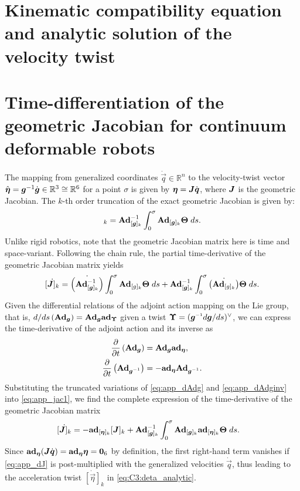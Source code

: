 \section{Kinematic compatibility equation and analytic solution of the velocity twist}

\section{Time-differentiation of the geometric Jacobian for continuum deformable robots} 
\label{app:C3:jacobian}
The mapping from generalized coordinates $\dot{\vec{q}} \in \mathbb{R}^n$ to the velocity-twist vector $\hat{\boldsymbol{\eta}} = \boldsymbol{g}^{-1} \dot{\boldsymbol{g}} \in \mathbb{R}^3 \cong \mathbb{R}^6$ for a point $\sigma$ is given by $\boldsymbol{\eta} = \boldsymbol{J}\dot{\boldsymbol{q}}$, where $\boldsymbol{J}$ is the geometric Jacobian. The $k$-th order truncation of the exact geometric Jacobian is given by:
%
\begin{equation}
[\mat{J}]_k = \Ad_{{[\mat{g}]_k}}^{-1} \int_0^\sigma \Ad_{[\mat{g}]_k} \mat{\Theta} \; ds. \label{eq:app_jac0}
\end{equation}
Unlike rigid robotics, note that the geometric Jacobian matrix here is time and space-variant. Following the chain rule, the partial time-derivative of the geometric Jacobian matrix yields
%
\begin{equation}
\dot{[\boldsymbol{J}]_k} = \dot{\left(\textbf{Ad}_{{[\boldsymbol{g}]_k}}^{-1}\right)} \int_0^\sigma \textbf{Ad}_{[g]_k} \boldsymbol{\Theta} \; ds + \textbf{Ad}_{{[\boldsymbol{g}]_k}}^{-1} \int_0^\sigma \dot{\left(\textbf{Ad}_{[g]_k}\right)} \boldsymbol{\Theta} \; ds. \label{eq:app_jac1}
\end{equation}
%
Given the differential relations of the adjoint action mapping on the Lie group, that is, ${d/ds}\left(\textbf{Ad}_{\boldsymbol{g}} \right) = \textbf{Ad}_{\boldsymbol{g}} \textbf{ad}_{\boldsymbol{\Upsilon}}$ given a twist $\vec{\Upsilon} = (\mat{g}\inv d\mat{g}/ds)^\vee$, we can express the time-derivative of the adjoint action and its inverse as
%
\begin{align}
\frac{\p}{\p t}\left(\Ad_{\mat{g}} \right) & = \Ad_{\mat{g}} \ad_{\vec{\eta}}, \label{eq:app_dAdg}\\
\frac{\p}{\p t}\left(\Ad_{\mat{g}\inv} \right) & = -\ad_{\vec{\eta}}\Ad_{\mat{g}\inv}. \label{eq:app_dAdginv}
\end{align}
%
Substituting the truncated variations of \eqref{eq:app_dAdg} and \eqref{eq:app_dAdginv} into \eqref{eq:app_jac1}, we find the complete expression of the time-derivative of the geometric Jacobian matrix
%
\begin{align}
\dot{[\boldsymbol{J}]_k} & = -\textbf{ad}_{[\boldsymbol{\eta}]_k} {[\boldsymbol{J}]_k} + \textbf{Ad}_{{[\boldsymbol{g}]_k}}^{-1} \int_0^\sigma \textbf{Ad}_{{[\boldsymbol{g}]_k}} \textbf{ad}_{[\boldsymbol{\eta}]_k} \boldsymbol{\Theta}\; ds. \label{eq:app_dJ}
\end{align}
%
Since $\textbf{ad}_{\boldsymbol{\eta}} (\boldsymbol{J} \dot{\boldsymbol{q}}) = \textbf{ad}_{\boldsymbol{\eta}} \boldsymbol{\eta} = \boldsymbol{0}_6$ by definition, the first right-hand term vanishes if \eqref{eq:app_dJ} is post-multiplied with the generalized velocities $\dot{\vec{q}}$, thus leading to the acceleration twist $\dot{[\vec{\eta}]}_k$ in \eqref{eq:C3:deta_analytic}. 

